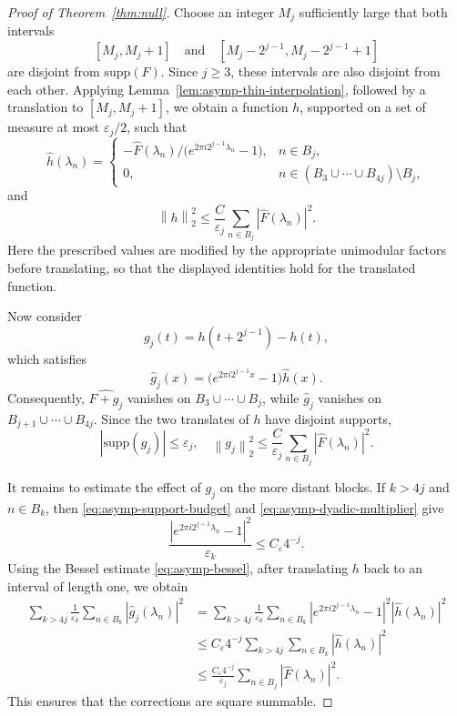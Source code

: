 \documentclass[reqno,a4paper,12pt]{amsart}
\numberwithin{equation}{section}
\newcommand{\supp}{{\mathrm{supp}}}
\newcommand\1{\mathds{1}}
\newcommand{\norm}[1]{\left\lVert #1 \right\rVert}
\begin{document}
\begin{proof}[Proof of Theorem~\ref{thm:null}]
Choose an integer \(M_j\) sufficiently large that both intervals
\[
    [M_j,M_j+1]
    \quad\text{and}\quad
    [M_j-2^{j-1},M_j-2^{j-1}+1]
\]
are disjoint from \(\supp (F)\). Since \(j\ge3\), these intervals
are also disjoint from each other.
Applying Lemma~\ref{lem:asymp-thin-interpolation}, followed by a
translation to \([M_j,M_j+1]\), we obtain a function \(h\), supported
on a set of measure at most \(\varepsilon_j/2\), such that
\[
    \widehat h(\lambda_n)=
    \begin{cases}
        -\widehat F(\lambda_n)/
        \bigl(e^{2\pi i2^{j-1}\lambda_n}-1\bigr),
        &n\in B_j,\\[1mm]
        0,
        &n\in(B_3\cup\cdots\cup B_{4j})\setminus B_j,
    \end{cases}
\]
and
\[
    \norm{h}_2^2
    \leq\frac{C}{\varepsilon_j}
    \sum_{n\in B_j}|\widehat F(\lambda_n)|^2.
\]
Here the prescribed values are modified by the appropriate unimodular
factors before translating, so that the displayed identities hold for
the translated function.

Now consider
\[
    g_j(t)=h(t+2^{j-1})-h(t),
\]
which satisfies
\[
    \widehat g_j(x)
    =\bigl(e^{2\pi i2^{j-1}x}-1\bigr)\widehat h(x).
\]
Consequently, \(\widehat{F+g_j}\) vanishes on
\(B_3\cup\cdots\cup B_j\), while \(\widehat g_j\) vanishes on
\(B_{j+1}\cup\cdots\cup B_{4j}\). Since the two translates of \(h\)
have disjoint supports,
\begin{equation}\label{eq:asymp-one-block}
    |\supp (g_j)|\leq\varepsilon_j,
    \quad
    \norm{g_j}_2^2
    \leq\frac{C}{\varepsilon_j}
    \sum_{n\in B_j}|\widehat F(\lambda_n)|^2.
\end{equation}

It remains to estimate the effect of \(g_j\) on the more distant
blocks. If \(k>4j\) and \(n\in B_k\), then
\eqref{eq:asymp-support-budget} and
\eqref{eq:asymp-dyadic-multiplier} give
\[
    \frac{
        |e^{2\pi i2^{j-1}\lambda_n}-1|^2
    }{\varepsilon_k}
    \leq C_\varepsilon4^{-j}.
\]
Using the Bessel estimate \eqref{eq:asymp-bessel}, after translating
\(h\) back to an interval of length one, we obtain
\begin{equation}\label{eq:asymp-far-blocks}
\begin{aligned}
    \sum_{k>4j}\frac1{\varepsilon_k}
    \sum_{n\in B_k}|\widehat g_j(\lambda_n)|^2
    &=
    \sum_{k>4j}\frac1{\varepsilon_k}
    \sum_{n\in B_k}
    |e^{2\pi i2^{j-1}\lambda_n}-1|^2
    |\widehat h(\lambda_n)|^2\\
    &\leq
    C_\varepsilon4^{-j}
    \sum_{k>4j}\sum_{n\in B_k}
    |\widehat h(\lambda_n)|^2\\
    &\leq
    \frac{C_\varepsilon4^{-j}}{\varepsilon_j}
    \sum_{n\in B_j}|\widehat F(\lambda_n)|^2.
\end{aligned}
\end{equation}
This ensures that the corrections are square summable.
\medskip


\end{proof}
\end{document}
